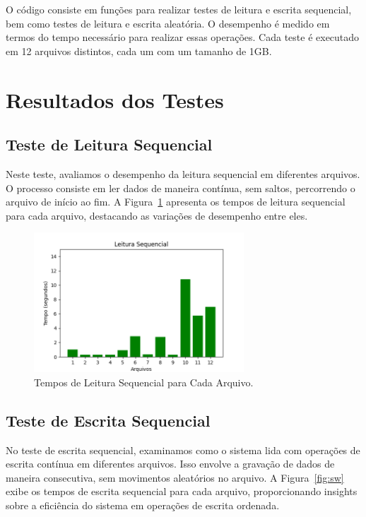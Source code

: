 \documentclass[
	12pt,				%
	openright,			%
	oneside,			%
	a4paper,			%
	chapter=TITLE,		%
	english,			%
	french,				%
	spanish,			%
	brazil				%
	]{abntex2}
\theoremstyle{definition}
\begin{document}
O código consiste em funções para realizar testes de leitura e escrita sequencial, 
bem como testes de leitura e escrita aleatória. O desempenho é medido em termos do 
tempo necessário para realizar essas operações. Cada teste é executado em 12 arquivos 
distintos, cada um com um tamanho de 1GB.

\section{Resultados dos Testes}

\subsection{Teste de Leitura Sequencial}

Neste teste, avaliamos o desempenho da leitura sequencial em diferentes arquivos. 
O processo consiste em ler dados de maneira contínua, sem saltos, percorrendo o 
arquivo de início ao fim. A Figura~\ref{fig:sr} apresenta os tempos de leitura 
sequencial para cada arquivo, destacando as variações de desempenho entre eles.

\begin{figure}[H]
    \centering
    \includegraphics[width=0.7\textwidth]{SeqRead.png}
    \caption{Tempos de Leitura Sequencial para Cada Arquivo.}
    \label{fig:sr}
\end{figure}


\subsection{Teste de Escrita Sequencial}

No teste de escrita sequencial, examinamos como o sistema lida com operações 
de escrita contínua em diferentes arquivos. Isso envolve a gravação de dados 
de maneira consecutiva, sem movimentos aleatórios no arquivo. 
A Figura~\ref{fig:sw} exibe os tempos de escrita sequencial para cada 
arquivo, proporcionando insights sobre a eficiência do sistema em 
operações de escrita ordenada.
\end{document}
